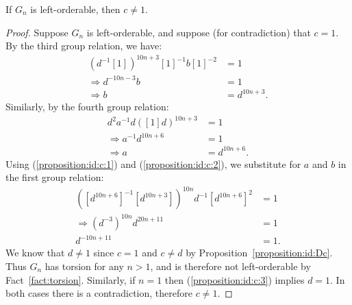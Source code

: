 \begin{proposition}
If $G_n$ is left-orderable, then $c\neq1$.
\label{proposition:id:c}
\end{proposition}
\begin{proof} Suppose $G_n$ is left-orderable, and suppose (for contradiction) that $c=1$. By the third group relation, we have:
\begin{align}
(d^{-1}[1])^{10n+3}[1]^{-1}b[1]^{-2} & =1\nonumber\\
\Rightarrow d^{-10n-3}b & =1\nonumber\\
\Rightarrow b & =d^{10n+3}.\label{proposition:id:c:1}
\end{align}
Similarly, by the fourth group relation:
\begin{align}
d^{2}a^{-1}d([1]d)^{10n+3} & =1\nonumber\\
\Rightarrow a^{-1}d^{10n+6} & =1\nonumber\\
\Rightarrow a & =d^{10n+6}.\label{proposition:id:c:2}
\end{align}
Using (\ref{proposition:id:c:1}) and (\ref{proposition:id:c:2}), we substitute for $a$ and $b$ in the first group relation:
\begin{align}
([d^{10n+6}]^{-1}[d^{10n+3}])^{10n}d^{-1}[d^{10n+6}]^{2} & =1\nonumber\\
\Rightarrow(d^{-3})^{10n}d^{20n+11} & =1\nonumber\\
d^{-10n+11} & =1.\label{proposition:id:c:3}
\end{align}
We know that $d\neq1$ since $c=1$ and $c\neq d$ by Proposition~\ref{proposition:id:Dc}. Thus $G_{n}$ has torsion for any $n>1$, and is therefore not left-orderable by Fact~\ref{fact:torsion}. Similarly, if $n=1$ then (\ref{proposition:id:c:3}) implies $d=1$. In both cases there is a contradiction, therefore $c\neq{}1$.
\end{proof}

